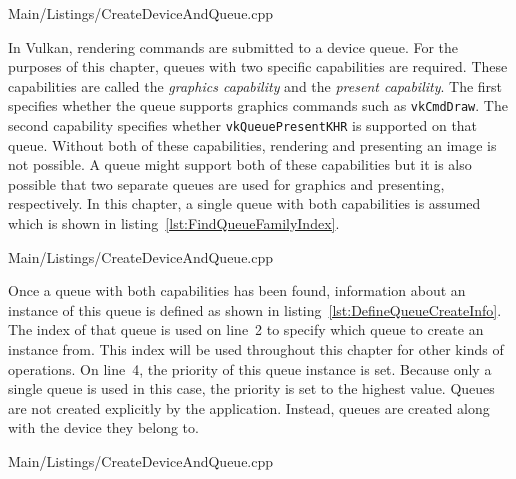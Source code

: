       
      {Main/Listings/CreateDeviceAndQueue.cpp}

      In Vulkan, rendering commands are submitted to a device queue.
      For the purposes of this chapter, queues with two specific capabilities are required.
      These capabilities are called the \textit{graphics capability} and the \textit{present capability}.
      The first specifies whether the queue supports graphics commands such as \lstinline{vkCmdDraw}.
      The second capability specifies whether \lstinline{vkQueuePresentKHR} is supported on that queue.
      Without both of these capabilities, rendering and presenting an image is not possible.
      A queue might support both of these capabilities but it is also possible that two separate queues are used for graphics and presenting, respectively.
      In this chapter, a single queue with both capabilities is assumed which is shown in listing~\ref{lst:FindQueueFamilyIndex}.

      
      {Main/Listings/CreateDeviceAndQueue.cpp}

      Once a queue with both capabilities has been found, information about an instance of this queue is defined as shown in listing~\ref{lst:DefineQueueCreateInfo}.
      The index of that queue is used on line~2 to specify which queue to create an instance from.
      This index will be used throughout this chapter for other kinds of operations.
      On line~4, the priority of this queue instance is set.
      Because only a single queue is used in this case, the priority is set to the highest value.
      Queues are not created explicitly by the application.
      Instead, queues are created along with the device they belong to.

      
      {Main/Listings/CreateDeviceAndQueue.cpp}


